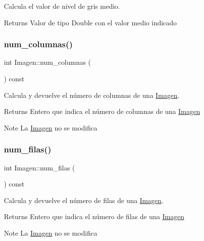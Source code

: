 Calcula el valor de nivel de gris medio. 

\begin{DoxyReturn}{Returns}
Valor de tipo Double con el valor medio indicado 
\end{DoxyReturn}
\mbox{\label{classImagen_ac28d55c18064aea2a65e6fcf51d86191}} 
\subsubsection{\texorpdfstring{num\+\_\+columnas()}{num\_columnas()}}
{\footnotesize\ttfamily int Imagen\+::num\+\_\+columnas (\begin{DoxyParamCaption}{ }\end{DoxyParamCaption}) const}



Calcula y devuelve el número de columnas de una \hyperlink{classImagen}{Imagen}. 

\begin{DoxyReturn}{Returns}
Entero que indica el número de columnas de una \hyperlink{classImagen}{Imagen} 
\end{DoxyReturn}
\begin{DoxyNote}{Note}
La \hyperlink{classImagen}{Imagen} no se modifica 
\end{DoxyNote}
\mbox{\label{classImagen_a4cb4faa04f5e2913965e43a6a65acfd1}} 
\subsubsection{\texorpdfstring{num\+\_\+filas()}{num\_filas()}}
{\footnotesize\ttfamily int Imagen\+::num\+\_\+filas (\begin{DoxyParamCaption}{ }\end{DoxyParamCaption}) const}



Calcula y devuelve el número de filas de una \hyperlink{classImagen}{Imagen}. 

\begin{DoxyReturn}{Returns}
Entero que indica el número de filas de una \hyperlink{classImagen}{Imagen} 
\end{DoxyReturn}
\begin{DoxyNote}{Note}
La \hyperlink{classImagen}{Imagen} no se modifica 
\end{DoxyNote}
\mbox{\label{classImagen_a9cfdf5f496d78247026783b4026458e8}} 
